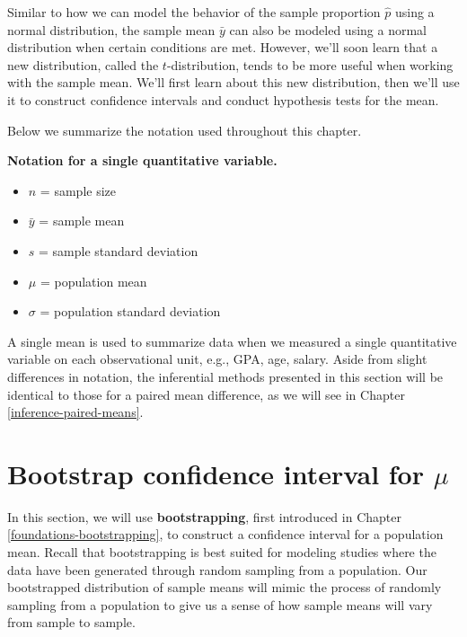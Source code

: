 \documentclass[
  10pt,
  openany]{book}
\providecommand{\tightlist}{%
  \setlength{\itemsep}{0pt}\setlength{\parskip}{0pt}}
\theoremstyle{definition}
\theoremstyle{definition}
\theoremstyle{definition}
\theoremstyle{definition}
\theoremstyle{remark}
\begin{document}
Similar to how we can model the behavior of the sample proportion \(\hat{p}\) using a normal distribution, the sample mean \(\bar{y}\) can also be modeled using a normal distribution when certain conditions are met.
 However, we'll soon learn that a new distribution, called the \(t\)-distribution, tends to be more useful when working with the sample mean.
We'll first learn about this new distribution, then we'll use it to construct confidence intervals and conduct hypothesis tests for the mean.

Below we summarize the notation used throughout this chapter.

\textbf{Notation for a single quantitative variable.}

\begin{itemize}
\tightlist
\item
  \(n\) = sample size
\item
  \(\bar{y}\) = sample mean
\item
  \(s\) = sample standard deviation
\item
  \(\mu\) = population mean
\item
  \(\sigma\) = population standard deviation
\end{itemize}

A single mean is used to summarize data when we measured a single quantitative variable on each observational unit, e.g., GPA, age, salary. Aside from slight differences in notation, the inferential methods presented in this section will be identical to those for a paired mean difference, as we will see in Chapter \ref{inference-paired-means}.

\section{\texorpdfstring{Bootstrap confidence interval for \(\mu\)}{Bootstrap confidence interval for \textbackslash mu}}\label{bootstrap-confidence-interval-for-mu}

In this section, we will use \textbf{bootstrapping}, first introduced in Chapter \ref{foundations-bootstrapping}, to construct a confidence interval for a population mean. Recall that bootstrapping is best suited for modeling studies where the data have been generated through random sampling from a population. Our bootstrapped distribution of sample means will mimic the process of randomly sampling from a population to give us a sense of how sample means will vary from sample to sample.
\end{document}
